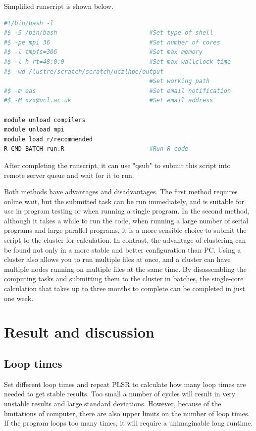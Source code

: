 \documentclass[a4paper,12pt,titlepage]{article} %
\numberwithin{equation}{section}  %
\begin{document}
\begin{enumerate}
	Simplified runscript is shown below.
	
	\begin{lstlisting}[language=sh]
#!/bin/bash -l
#$ -S /bin/bash                          #Set type of shell
#$ -pe mpi 36                            #Set number of cores
#$ -l tmpfs=30G                          #Set max memory
#$ -l h_rt=48:0:0                        #Set max wallclock time
#$ -wd /lustre/scratch/scratch/uczlhpe/output
                                         #Set working path
#$ -m eas                                #Set email notification
#$ -M xxx@ucl.ac.uk                      #Set email address

module unload compilers
module unload mpi
module load r/recommended
R CMD BATCH run.R                        #Run R code
	\end{lstlisting}
	
After completing the runscript, it can use "qsub" to submit this script into remote server queue and wait for it to run.
	
	\end{enumerate}
	
	Both methods have advantages and disadvantages.
	The first method requires online wait, but the submitted task can be run immediately, and is suitable for use in program testing or when running a single program. In the second method, although it takes a while to run the code, when running a large number of serial programs and large parallel programs, it is a more sensible choice to submit the script to the cluster for calculation. In contrast, the advantage of clustering can be found not only in a more stable and better configuration than PC. Using a cluster also allows you to run multiple files at once, and a cluster can have multiple nodes running on multiple files at the same time. By disassembling the computing tasks and submitting them to the cluster in batches, the single-core calculation that takes up to three months to complete can be completed in just one week.
	
	\section{Result and discussion}
	\label{sec:result}
	
	\subsection{Loop times}
	\label{sec:Loop times}
	
	Set different loop times and repeat PLSR to calculate how many loop times are needed to get stable results. Too small a number of cycles will result in very unstable results and large standard deviations. However, because of the limitations of computer, there are also upper limits on the number of loop times. If the program loops too many times, it will require a unimaginable long runtime.
	
\end{document}
